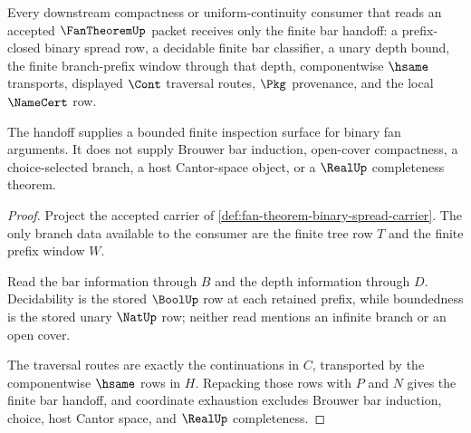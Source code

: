\begin{theorem}
\label{thm:fan-theorem-finite-bar-handoff}
Every downstream compactness or uniform-continuity consumer that reads an accepted $\FanTheoremUp$ packet receives only the finite bar handoff: a prefix-closed binary spread row, a decidable finite bar classifier, a unary depth bound, the finite branch-prefix window through that depth, componentwise $\hsame$ transports, displayed $\Cont$ traversal routes, $\Pkg$ provenance, and the local $\NameCert$ row.

The handoff supplies a bounded finite inspection surface for binary fan arguments. It does not supply Brouwer bar induction, open-cover compactness, a choice-selected branch, a host Cantor-space object, or a $\RealUp$ completeness theorem.
\end{theorem}
\begin{proof}
Project the accepted carrier of \autoref{def:fan-theorem-binary-spread-carrier}. The only branch data available to the consumer are the finite tree row $T$ and the finite prefix window $W$.

Read the bar information through $B$ and the depth information through $D$. Decidability is the stored $\BoolUp$ row at each retained prefix, while boundedness is the stored unary $\NatUp$ row; neither read mentions an infinite branch or an open cover.

The traversal routes are exactly the continuations in $C$, transported by the componentwise $\hsame$ rows in $H$. Repacking those rows with $P$ and $N$ gives the finite bar handoff, and coordinate exhaustion excludes Brouwer bar induction, choice, host Cantor space, and $\RealUp$ completeness.
\end{proof}


